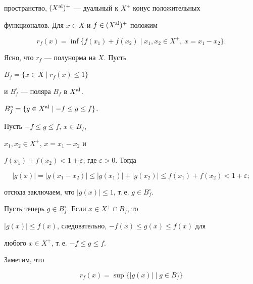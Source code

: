пространство, $(X^{\operatorname{al}})^+$ --- дуальный к $X^+$ конус положительных 


функционалов. Для $x \in X$ и $f \in (X^{\operatorname{al}})^+$ положим


$$


r_f (x)=\inf \{f(x_1) + f(x_2) \mid 


x_1, x_2 \in X^+, \ x=x_1 - x_2\}.


$$


Ясно, что $r_f$ --- полунорма на $X$. Пусть 


$B_f=\{x \in X \mid r_f (x) \le 1\} $ 


и $B_f^{\circ}$ --- поляра $B_f$ в $X^{\operatorname{al}}$.





\begin{prop}


$B_f^{\circ}=\{g \in X^{\operatorname{al}} \mid - f \le g \le f\}$.


\end{prop}





\begin{pf}


Пусть $- f \le g \le f$, $x \in B_f$, 


$x_1, x_2 \in X^+$, $x=x_1 - x_2$ и 


$f(x_1) + f(x_2) < 1 + \varepsilon $, где $\varepsilon > 0$. Тогда


$$


|g(x)|=|g(x_1 - x_2)| \le |g(x_1)| + |g(x_2)| 


\le f(x_1) + f(x_2) < 1 + \varepsilon ;


$$


отсюда заключаем, что $|g(x)| \le 1$, т.\,е. $g \in B_f^{\circ}$. 


Пусть теперь $g \in B_f^{\circ}$. Если $x \in X^+ \cap B_f$, то


$|g(x)| \le f(x)$, следовательно, $- f(x) \le g(x) \le f(x)$ для


любого $x \in X^+$, т.\,е. $- f \le g \le f$.


\end{pf}





Заметим, что 


\begin{equation}


r_f (x)=\sup \{|g(x)| \mid g \in B_f^{\circ}\} 


\end{equation}



